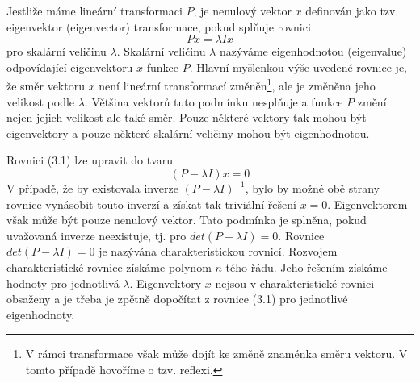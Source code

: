 \documentclass[a4paper]{book}
\begin{document}
Jestliže máme lineární transformaci $P$, je nenulový vektor $x$ definován jako tzv. eigenvektor (eigenvector) transformace, pokud splňuje rovnici
\begin{equation}
Px = \lambda I x
\end{equation}
pro skalární veličinu $\lambda$. Skalární veličinu $\lambda$ nazýváme eigenhodnotou (eigenvalue) odpovídající eigenvektoru $x$ funkce $P$. Hlavní myšlenkou výše uvedené rovnice je, že směr vektoru $x$ není lineární transformací změněn\footnote{V rámci transformace však může dojít ke změně znaménka směru vektoru. V tomto případě hovoříme o tzv. reflexi.}, ale je změněna jeho velikost podle $\lambda$. Většina vektorů tuto podmínku nesplňuje a funkce $P$ změní nejen jejich velikost ale také směr. Pouze některé vektory tak mohou být eigenvektory a pouze některé skalární veličiny mohou být eigenhodnotou.

Rovnici (3.1) lze upravit do tvaru
\begin{equation*}
(P - \lambda I)x = 0
\end{equation*}
V případě, že by existovala inverze $(P - \lambda I)^{-1}$, bylo by možné obě strany rovnice vynásobit touto inverzí a získat tak triviální řešení $x = 0$. Eigenvektorem však může být pouze nenulový vektor. Tato podmínka je splněna, pokud uvažovaná inverze neexistuje, tj. pro $det(P - \lambda I) = 0$. Rovnice $det(P - \lambda I) = 0$ je nazývána charakteristickou rovnicí. Rozvojem charakteristické rovnice získáme polynom $n$-tého řádu. Jeho řešením získáme hodnoty pro jednotlivá $\lambda$. Eigenvektory $x$ nejsou v charakteristické rovnici obsaženy a je třeba je zpětně dopočítat z rovnice (3.1) pro jednotlivé eigenhodnoty.\\
\end{document}
